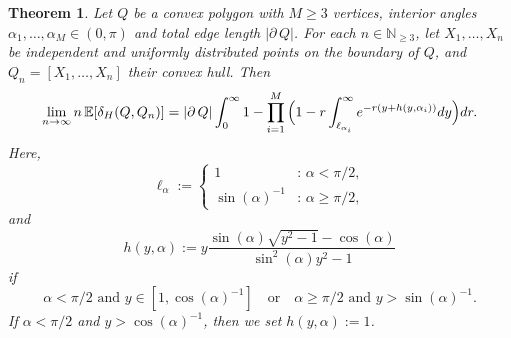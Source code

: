 \documentclass[a4paper,12pt]{article}
\newtheorem{theorem}{Theorem}
\theoremstyle{definition}
\newcommand{\IE}{\mathbb{E}}
\newcommand{\IN}{\mathbb{N}}
\newcommand{\dd}{{\rm d}}
\begin{document}
\begin{theorem} \label{thm:polygon}
Let $Q$ be a convex polygon with $M\ge 3$ vertices, interior angles $\alpha_1,\dots,\alpha_M\in (0,\pi)$ and total edge length  $\left| \partial \, Q \right|$. For each $n\in\IN_{\geq 3}$, let $X_1,\dots,X_n$ be  independent and uniformly distributed points on the boundary of $Q$, and $Q_n=[X_1,\dots,X_n]$ their convex hull. Then
\begin{equation}\label{polygon-1}
\lim_{n\to\infty}n \, \IE[\delta_H(Q,Q_n)]
= \left| \partial \, Q \right| \int_{0}^{\infty}1-\prod_{i=1}^M\Big(1-r\int_{\ell_{\alpha_i}}^{\infty}e^{-r(y+h(y,\alpha_i))}\dd y \Big)\dd r.
\end{equation}
Here,
\begin{equation}\label{polygon-3}
\ell_{\alpha}:=
\begin{cases}
1 &:\,\alpha<\pi/2,\\
\sin(\alpha)^{-1}&:\,\alpha\ge \pi/2,
\end{cases}
\end{equation}
and
\begin{equation}\label{polygon-4}
h(y,\alpha)
:= y\frac{\sin(\alpha)\sqrt{y^2-1}-\cos(\alpha)}{\sin^2(\alpha)y^2-1}
\end{equation}
if
\[
\alpha<\pi/2 \text{ and }y\in [1,\cos(\alpha)^{-1}] \quad\text{or}\quad \alpha\ge \pi/2 \text{ and } y>\sin(\alpha)^{-1}.
\]
If  $\alpha<\pi/2$ and $y>\cos(\alpha)^{-1}$, then we set $h(y,\alpha):=1$.	
\end{theorem}
\end{document}
